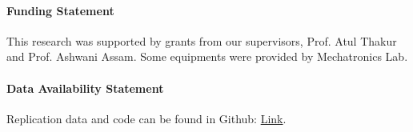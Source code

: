 \documentclass[
  journal=largetwo,
  manuscript=article-type,
  year=2023,
  volume=1,
]{iitp-journal}
\begin{document}
\paragraph{Funding Statement}

This research was supported by grants from our supervisors, Prof. Atul Thakur and Prof. Ashwani Assam. Some equipments were provided by Mechatronics Lab.



\paragraph{Data Availability Statement}

Replication data and code can be found in Github: \href{https://github.com/KartuzGupta/ME395_Quadcopter}{Link}.




\printbibliography
\end{document}
